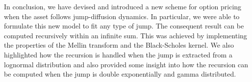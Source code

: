 In conclusion, we have devised and introduced a new scheme for option pricing when the asset follows jump-diffusion dynamics. In particular, we were able to formulate this new model to fit any type of jump. The consequent result can be computed recursively within an infinite sum. This was achieved by implementing the properties of the Mellin transform and the Black-Scholes kernel. We also highlighted how the recursion is handled when the jump is extracted from a lognormal distribution and also provided some insight into how the recursion can be computed when the jump is double exponentially and gamma distributed. 

